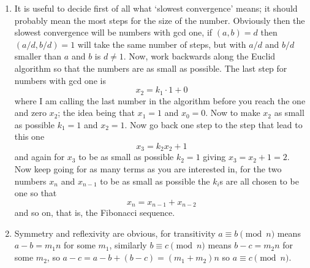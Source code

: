 \documentclass[12pt]{article}
\begin{document}
\begin{enumerate}
\item It is useful to decide first of all what \lq{}slowest
  convergence\rq{} means; it should probably mean the most steps for
  the size of the number. Obviously then the slowest convergence will
  be numbers with gcd one, if $(a,b)=d$ then $(a/d,b/d)=1$ will take
  the same number of steps, but with $a/d$ and $b/d$ smaller than $a$
  and $b$ is $d\not=1$. Now, work backwards along the Euclid algorithm
  so that the numbers are as small as possible. The last step for
  numbers with gcd one is
\begin{equation}
x_2=k_1\cdot 1+0
\end{equation}
where I am calling the last number in the algorithm before you reach the one and zero $x_2$; the idea being that $x_1=1$ and $x_0=0$. Now to make $x_2$ as small as possible $k_1=1$ and $x_2=1$. Now go back one step to the step that lead to this one
\begin{equation}
x_3=k_2x_2+1
\end{equation}
and again for $x_3$ to be as small as possible $k_2=1$ giving $x_3=x_2+1=2$. Now keep going for as many terms as you are interested in, for the two numbers $x_n$ and $x_{n-1}$ to be as small as possible the $k_i$s are all chosen to be one so that
\begin{equation}
x_n=x_{n-1}+x_{n-2}
\end{equation}
and so on, that is, the Fibonacci sequence.

\item Symmetry and reflexivity are obvious, for transitivity $a\equiv
  b\pmod{n}$ means $a-b=m_1n$ for some $m_1$, similarly $b\equiv c\pmod{n}$ means $b-c=m_2n$ for some $m_2$, so $a-c=a-b+(b-c)=(m_1+m_2)n$ so $a\equiv c\pmod{n}$.

\end{enumerate}
\end{document}
